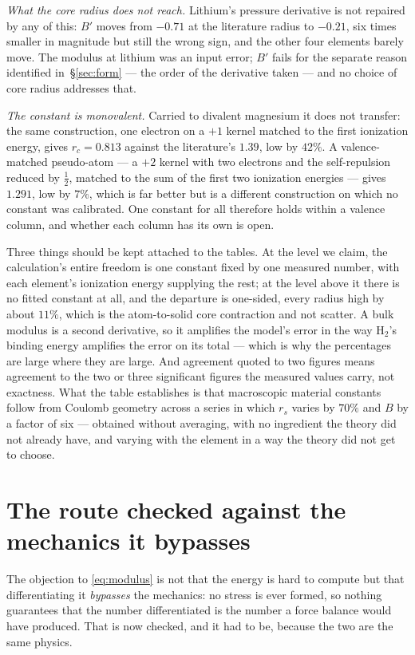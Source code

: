 \documentclass[11pt]{article}
\begin{document}
\emph{What the core radius does not reach.} Lithium's pressure derivative is not repaired by any of
this: $B'$ moves from $-0.71$ at the literature radius to $-0.21$, six times smaller in magnitude but
still the wrong sign, and the other four elements barely move. The modulus at lithium was an input
error; $B'$ fails for the separate reason identified in~\S\ref{sec:form} --- the order of the
derivative taken --- and no choice of core radius addresses that.

\emph{The constant is monovalent.} Carried to divalent magnesium it does not transfer: the same
construction, one electron on a $+1$ kernel matched to the first ionization energy, gives
$r_c=0.813$ against the literature's $1.39$, low by $42\%$. A valence-matched pseudo-atom --- a $+2$
kernel with two electrons and the self-repulsion reduced by $\tfrac12$, matched to the sum of the
first two ionization energies --- gives $1.291$, low by $7\%$, which is far better but is a different
construction on which no constant was calibrated. One constant for all therefore holds within a
valence column, and whether each column has its own is open.

Three things should be kept attached to the tables. At the level we claim, the calculation's entire
freedom is one constant fixed by one measured number, with each element's ionization energy supplying
the rest; at the level above it there is no fitted constant at all, and the departure is
one-sided, every radius high by about $11\%$, which is the atom-to-solid core contraction and not
scatter. A bulk modulus is a second derivative, so it amplifies the model's error in the way
H$_2$'s binding energy amplifies the error on its total --- which is why the percentages are large
where they are large. And agreement quoted to two figures means agreement to the two or three
significant figures the measured values carry, not exactness. What the table establishes is that
macroscopic material constants follow from Coulomb geometry across a series in which $r_s$ varies by
$70\%$ and $B$ by a factor of six --- obtained without averaging, with no ingredient the theory did
not already have, and varying with the element in a way the theory did not get to choose.

\section{The route checked against the mechanics it bypasses}\label{sec:checks}

The objection to \eqref{eq:modulus} is not that the energy is hard to compute but that differentiating it
\emph{bypasses} the mechanics: no stress is ever formed, so nothing guarantees that the number
differentiated is the number a force balance would have produced. That is now checked, and it had
to be, because the two are the same physics.
\end{document}

